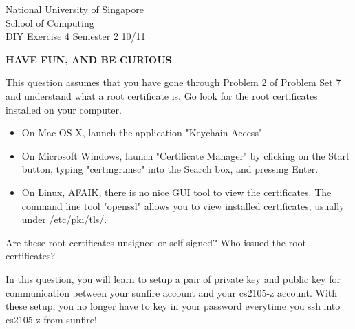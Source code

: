 \documentclass[a4paper,11pt]{exam}
\begin{document}
\extraheadheight{.5in}
%
{\large\sf National University of Singapore\\ School of Computing \\
\LARGE\sf DIY Exercise 4}%
{\large\sf Semester 2 10/11}
\firstpageheadrule
\pagestyle{headandfoot}

\begin{center}
	\textbf\textsf{HAVE FUN, AND BE CURIOUS}
\end{center}

\begin{questions}

\question This question assumes that you have gone through Problem 2 of Problem Set 7 and understand what a root certificate is.  Go look for the root certificates installed on your computer.  
\begin{itemize}
\item On Mac OS X, launch the application "Keychain Access"
\item On Microsoft Windows, launch "Certificate Manager" by clicking on the Start button, typing "certmgr.msc" into the Search box, and pressing Enter.
\item On Linux, AFAIK, there is no nice GUI tool to view the certificates.  The command line tool "openssl" allows you to view installed certificates, usually under /etc/pki/tls/.
\end{itemize}

Are these root certificates unsigned or self-signed?  Who issued the root certificates?

\question
In this question, you will learn to setup a pair of private key and public key for communication between your sunfire account and your cs2105-z account.  With these setup, you no longer have to key in your password everytime you ssh into cs2105-z from sunfire!


\end{questions}
\end{document}
